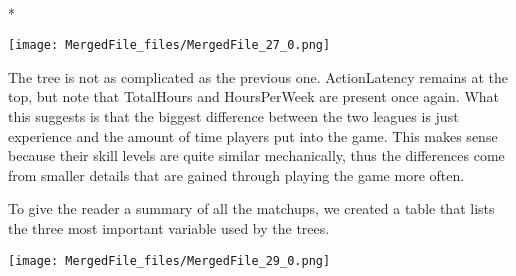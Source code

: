 \documentclass[letterpaper,10pt,english]{/usr/share/sphinx/texinputs/sphinxhowto}
\def\smaller{\fontsize{9.5pt}{9.5pt}\selectfont}
\newenvironment{InvisibleVerbatim}
        {\begin{mdframed}[leftmargin=0.1\linewidth,innerleftmargin=3pt,innerrightmargin=3pt, userdefinedwidth=1\linewidth, linewidth=0pt, linecolor=white, usetwoside=false]}
        {\end{mdframed}}
\begin{document}
        

            
                \makebox[0.1\linewidth]{\smaller\hfill\tt\color{nbframe-out-prompt}Out\hspace{4pt}{[}200{]}:\hspace{4pt}}\\*
                \vspace{-2.55\baselineskip}\begin{InvisibleVerbatim}
                \vspace{-0.5\baselineskip}
    \begin{center}
    \texttt{[image: MergedFile\_files/MergedFile\_27\_0.png]}
    \par
    \end{center}
    
            \end{InvisibleVerbatim}
            
        
    
The tree is not as complicated as the previous one. ActionLatency
remains at the top, but note that TotalHours and HoursPerWeek are
present once again. What this suggests is that the biggest difference
between the two leagues is just experience and the amount of time
players put into the game. This makes sense because their skill levels
are quite similar mechanically, thus the differences come from smaller
details that are gained through playing the game more often.

To give the reader a summary of all the matchups, we created a table
that lists the three most important variable used by the trees.

    

        
        

            
                \begin{InvisibleVerbatim}
                \vspace{-0.5\baselineskip}
    \begin{center}
    \texttt{[image: MergedFile\_files/MergedFile\_29\_0.png]}
    \par
    \end{center}
    
            \end{InvisibleVerbatim}
            
\end{document}
